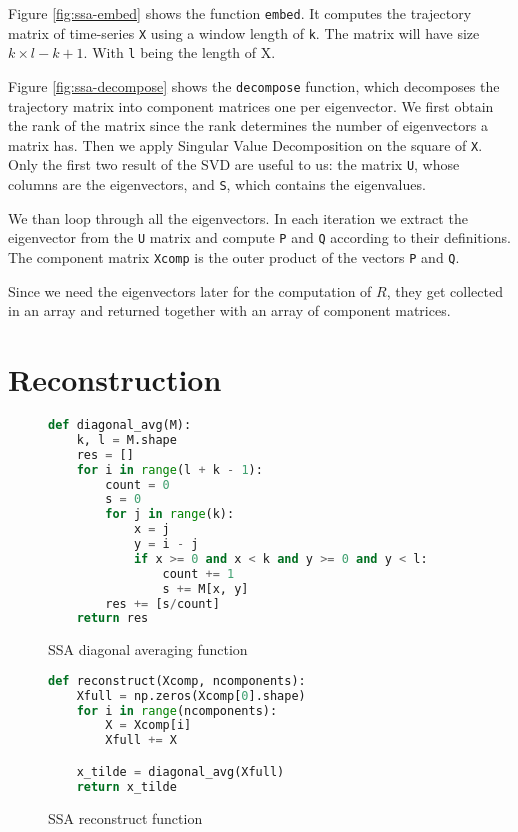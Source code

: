 Figure \ref{fig:ssa-embed} shows the function \texttt{embed}. It computes the trajectory matrix of time-series \texttt{X} using a window length of \texttt{k}. The matrix will have size $k \times l-k+1$. With \texttt{l} being the length of X. 

Figure \ref{fig:ssa-decompose} shows the \texttt{decompose} function, which decomposes the trajectory matrix into component matrices one per eigenvector.  We first obtain the rank of the matrix since the rank determines the number of eigenvectors a matrix has. Then we apply Singular Value Decomposition on the square of \texttt{X}. Only the first two result of the SVD are useful to us: the matrix \texttt{U}, whose columns are the eigenvectors, and \texttt{S}, which contains the eigenvalues. 

We than loop through all the eigenvectors. In each iteration we extract the eigenvector from the \texttt{U} matrix and compute \texttt{P} and \texttt{Q} according to their definitions. The component matrix \texttt{Xcomp} is the outer product of the vectors \texttt{P} and \texttt{Q}. 

Since we need the eigenvectors later for the computation of $R$, they get collected in an array and returned together with an array of component matrices. 

\section{Reconstruction}

\begin{figure}
\begin{singlespace}
\begin{lstlisting}[language=Python]
def diagonal_avg(M):
    k, l = M.shape
    res = []
    for i in range(l + k - 1):
        count = 0
        s = 0
        for j in range(k):
            x = j
            y = i - j
            if x >= 0 and x < k and y >= 0 and y < l:
                count += 1
                s += M[x, y]
        res += [s/count]
    return res
\end{lstlisting}
\end{singlespace}
\caption{SSA diagonal averaging function}    
\label{fig:ssa-diag-avg}
\end{figure}

\begin{figure}
\begin{singlespace}
\begin{lstlisting}[language=Python]
def reconstruct(Xcomp, ncomponents):
    Xfull = np.zeros(Xcomp[0].shape)
    for i in range(ncomponents):
        X = Xcomp[i]
        Xfull += X

    x_tilde = diagonal_avg(Xfull)
    return x_tilde
\end{lstlisting}
\end{singlespace}
\caption{SSA reconstruct function}    
\label{fig:ssa-reconstruct}
\end{figure}

